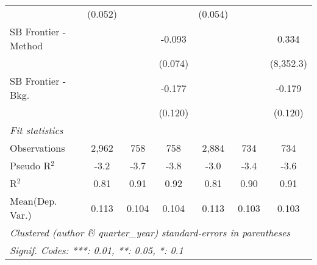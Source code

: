 \begin{tabular}{lcccccc}
                                & (0.052)       &         &              & (0.054)       &             &   \\   
   SB Frontier - Method         &               &         & -0.093       &               &             & 0.334\\   
                                &               &         & (0.074)      &               &             & (8,352.3)\\   
   SB Frontier - Bkg.           &               &         & -0.177       &               &             & -0.179\\   
                                &               &         & (0.120)      &               &             & (0.120)\\   
   \midrule
   \emph{Fit statistics}\\
   Observations                 & 2,962         & 758     & 758          & 2,884         & 734         & 734\\  
   Pseudo R$^2$                 & -3.2          & -3.7    & -3.8         & -3.0          & -3.4        & -3.6\\  
   R$^2$                        & 0.81          & 0.91    & 0.92         & 0.81          & 0.90        & 0.91\\  
Mean(Dep. Var.) & 0.113 & 0.104 & 0.104 & 0.113 & 0.103 & 0.103 \\
   \midrule \midrule
   \multicolumn{7}{l}{\emph{Clustered (author \& quarter\_year) standard-errors in parentheses}}\\
   \multicolumn{7}{l}{\emph{Signif. Codes: ***: 0.01, **: 0.05, *: 0.1}}\\
\end{tabular}
\par\endgroup
